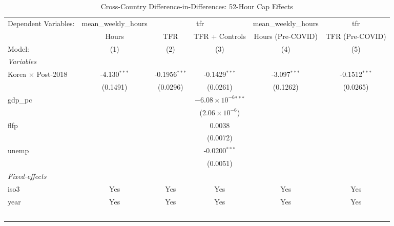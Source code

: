 
\begin{table}[htbp]
   \caption{\label{tab:did} Cross-Country Difference-in-Differences: 52-Hour Cap Effects}
   \centering
   \begin{adjustbox}{max width=\textwidth}
   \begin{tabular}{lccccc}
      \tabularnewline \midrule \midrule
      Dependent Variables: & mean\_weekly\_hours & \multicolumn{2}{c}{tfr} & mean\_weekly\_hours & tfr\\
                             & Hours          & TFR             & TFR + Controls                 & Hours (Pre-COVID) & TFR (Pre-COVID) \\   
      Model:                 & (1)            & (2)             & (3)                            & (4)               & (5)\\  
      \midrule
      \emph{Variables}\\
      Korea $\times$ Post-2018  & -4.130$^{***}$ & -0.1956$^{***}$ & -0.1429$^{***}$                & -3.097$^{***}$    & -0.1512$^{***}$\\   
                             & (0.1491)       & (0.0296)        & (0.0261)                       & (0.1262)          & (0.0265)\\   
      gdp\_pc                &                &                 & $-6.08\times 10^{-6}$$^{***}$  &                   &   \\   
                             &                &                 & ($2.06\times 10^{-6}$)         &                   &   \\   
      flfp                   &                &                 & 0.0038                         &                   &   \\   
                             &                &                 & (0.0072)                       &                   &   \\   
      unemp                  &                &                 & -0.0200$^{***}$                &                   &   \\   
                             &                &                 & (0.0051)                       &                   &   \\   
      \midrule
      \emph{Fixed-effects}\\
      iso3                   & Yes            & Yes             & Yes                            & Yes               & Yes\\  
      year                   & Yes            & Yes             & Yes                            & Yes               & Yes\\  
$$
\end{tabular}
\end{adjustbox}
\end{table}
